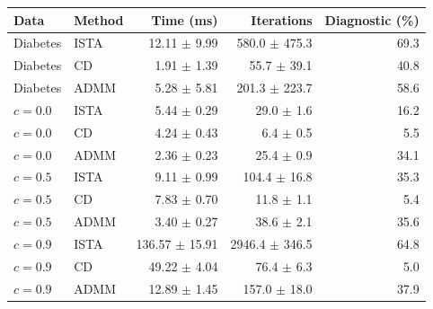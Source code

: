 \begin{tabular}{llrrr}
\toprule
Data & Method & Time (ms) & Iterations & Diagnostic (\%) \\
\midrule
Diabetes & ISTA & 12.11 $\pm$ 9.99 & 580.0 $\pm$ 475.3 & 69.3 \\
Diabetes & CD & 1.91 $\pm$ 1.39 & 55.7 $\pm$ 39.1 & 40.8 \\
Diabetes & ADMM & 5.28 $\pm$ 5.81 & 201.3 $\pm$ 223.7 & 58.6 \\
$c=0.0$ & ISTA & 5.44 $\pm$ 0.29 & 29.0 $\pm$ 1.6 & 16.2 \\
$c=0.0$ & CD & 4.24 $\pm$ 0.43 & 6.4 $\pm$ 0.5 & 5.5 \\
$c=0.0$ & ADMM & 2.36 $\pm$ 0.23 & 25.4 $\pm$ 0.9 & 34.1 \\
$c=0.5$ & ISTA & 9.11 $\pm$ 0.99 & 104.4 $\pm$ 16.8 & 35.3 \\
$c=0.5$ & CD & 7.83 $\pm$ 0.70 & 11.8 $\pm$ 1.1 & 5.4 \\
$c=0.5$ & ADMM & 3.40 $\pm$ 0.27 & 38.6 $\pm$ 2.1 & 35.6 \\
$c=0.9$ & ISTA & 136.57 $\pm$ 15.91 & 2946.4 $\pm$ 346.5 & 64.8 \\
$c=0.9$ & CD & 49.22 $\pm$ 4.04 & 76.4 $\pm$ 6.3 & 5.0 \\
$c=0.9$ & ADMM & 12.89 $\pm$ 1.45 & 157.0 $\pm$ 18.0 & 37.9 \\
\bottomrule
\end{tabular}
